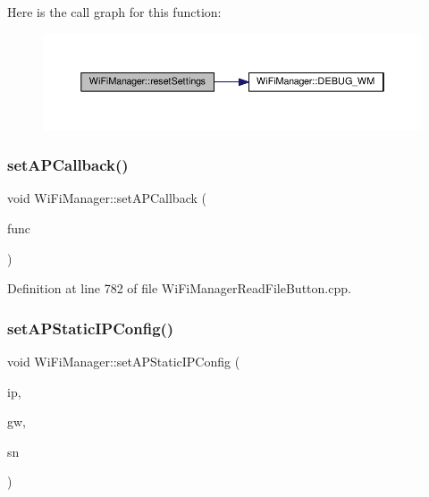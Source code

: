Here is the call graph for this function\+:\nopagebreak
\begin{figure}[H]
\begin{center}
\leavevmode
\includegraphics[width=350pt]{class_wi_fi_manager_a0027749816b6c66bc845d7c5db760a33_cgraph}
\end{center}
\end{figure}
\mbox{\label{class_wi_fi_manager_a353ab556f96020ad7a08e9a91cea8bea}} 
\subsubsection{\texorpdfstring{set\+A\+P\+Callback()}{setAPCallback()}}
{\footnotesize\ttfamily void Wi\+Fi\+Manager\+::set\+A\+P\+Callback (\begin{DoxyParamCaption}\item[{void($\ast$)(\hyperlink{class_wi_fi_manager}{Wi\+Fi\+Manager} $\ast$)}]{func }\end{DoxyParamCaption})}



Definition at line 782 of file Wi\+Fi\+Manager\+Read\+File\+Button.\+cpp.

\mbox{\label{class_wi_fi_manager_a70007205081cd9bfe4123b65553adf42}} 
\subsubsection{\texorpdfstring{set\+A\+P\+Static\+I\+P\+Config()}{setAPStaticIPConfig()}}
{\footnotesize\ttfamily void Wi\+Fi\+Manager\+::set\+A\+P\+Static\+I\+P\+Config (\begin{DoxyParamCaption}\item[{I\+P\+Address}]{ip,  }\item[{I\+P\+Address}]{gw,  }\item[{I\+P\+Address}]{sn }\end{DoxyParamCaption})}



